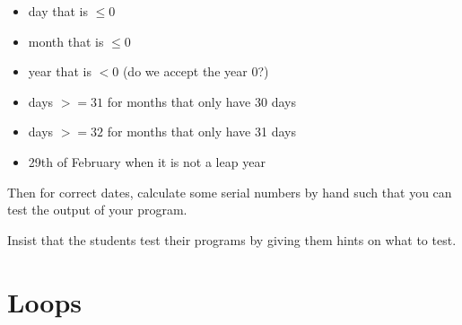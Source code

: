 \documentclass[
  fontsize=10pt,
  a4paper,
]{scrartcl}
\newenvironment{howTILEd}%
  {\begin{mdframed}[skipabove=10pt,skipbelow=10pt,backgroundcolor=pink!40]}%
  {\end{mdframed}}
\begin{document}
\begin{enumerate}
\begin{itemize}
    \item day that is $\leq 0$
    \item month that is $\leq 0$
    \item year that is $< 0$ (do we accept the year 0?)
    \item days $>=31$ for months that only have 30 days
    \item days $>=32$ for months that only have 31 days
    \item 29th of February when it is not a leap year
\end{itemize}

Then for correct dates, calculate some serial numbers by hand such that you can test the output of your program.

\begin{howTILEd}
Insist that the students test their programs by giving them hints on what to test.
\end{howTILEd}

\end{enumerate}


\hypertarget{boletin4}{%
\section{Loops}\label{section.loops}}
\end{document}
